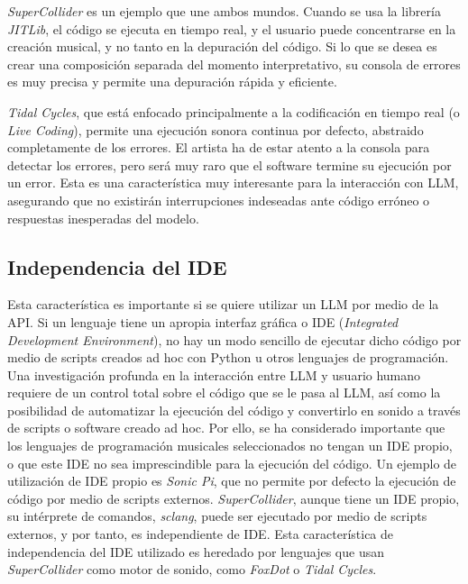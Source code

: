 \textit{SuperCollider} es un ejemplo que une ambos mundos. Cuando se usa la librería \textit{JITLib}, el código se ejecuta en tiempo real, y el usuario puede concentrarse en la creación musical, y no tanto en la depuración del código. Si lo que se desea es crear una composición separada del momento interpretativo, su consola de errores es muy precisa y permite una depuración rápida y eficiente.

\textit{Tidal Cycles}, que está enfocado principalmente a la codificación en tiempo real (o \textit{Live Coding}), permite una ejecución sonora continua por defecto, abstraido completamente de los errores. El artista ha de estar atento a la consola para detectar los errores, pero será muy raro que el software termine su ejecución por un error. Esta es una característica muy interesante para la interacción con LLM, asegurando que no existirán interrupciones indeseadas ante código erróneo o respuestas inesperadas del modelo.

\subsection{Independencia del IDE}
Esta característica es importante si se quiere utilizar un LLM por medio de la API. Si un lenguaje tiene un apropia interfaz gráfica o IDE (\textit{Integrated Development Environment}), no hay un modo sencillo de ejecutar dicho código por medio de scripts creados ad hoc con Python u otros lenguajes de programación. Una investigación profunda en la interacción entre LLM y usuario humano requiere de un control total sobre el código que se le pasa al LLM, así como la posibilidad de automatizar la ejecución del código y convertirlo en sonido a través de scripts o software creado ad hoc. Por ello, se ha considerado importante que los lenguajes de programación musicales seleccionados no tengan un IDE propio, o que este IDE no sea imprescindible para la ejecución del código. Un ejemplo de utilización de IDE propio es \textit{Sonic Pi}, que no permite por defecto la ejecución de código por medio de scripts externos. \textit{SuperCollider}, aunque tiene un IDE propio, su intérprete de comandos, \textit{sclang}, puede ser ejecutado por medio de scripts externos, y por tanto, es independiente de IDE. Esta característica de independencia del IDE utilizado es heredado por lenguajes que usan \textit{SuperCollider} como motor de sonido, como \textit{FoxDot} o \textit{Tidal Cycles}.


